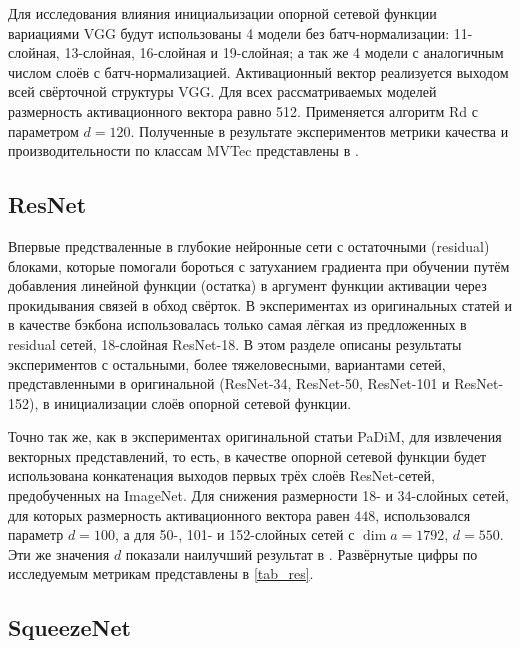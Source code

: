 \documentclass{article}
\begin{document}
\begin{large}
Для исследования влияния инициальизации опорной сетевой функции вариациями VGG будут использованы 4 модели без батч-нормализации: 11-слойная, 13-слойная, 16-слойная и 19-слойная; а так же 4 модели с аналогичным числом слоёв с батч-нормализацией. Активационный вектор реализуется выходом всей свёрточной структуры VGG. Для всех рассматриваемых моделей размерность активационного вектора равно 512. Применяется алгоритм Rd с параметром $d = 120$. Полученные в результате экспериментов метрики качества и производительности по классам MVTec представлены в .

\subsection{ResNet}

Впервые предстваленные в \cite{resnet} глубокие нейронные сети с остаточными (residual) блоками, которые помогали бороться с затуханием градиента при обучении путём добавления линейной функции (остатка) в аргумент функции активации через прокидывания связей в обход свёрток. В экспериментах из оригинальных статей \cite{spade} и \cite{padim} в качестве бэкбона использовалась только самая лёгкая из предложенных в \cite{resnet} residual сетей, 18-слойная ResNet-18. В этом разделе описаны результаты экспериментов с остальными, более тяжеловесными, вариантами сетей, представленными в оригинальной \cite{resnet} (ResNet-34, ResNet-50, ResNet-101 и ResNet-152), в инициализации слоёв опорной сетевой функции.

Точно так же, как в экспериментах оригинальной статьи PaDiM, для извлечения векторных представлений, то есть, в качестве опорной сетевой функции будет использована конкатенация выходов первых трёх слоёв ResNet-сетей, предобученных на ImageNet. Для снижения размерности 18- и 34-слойных сетей, для которых размерность активационного вектора равен $448$, использовался параметр $d = 100$, а для 50-, 101- и 152-слойных сетей с $\dim a = 1792$, $d = 550$. Эти же значения $d$ показали наилучший результат в \cite{padim}. Развёрнутые цифры по исследуемым метрикам представлены в \ref{tab_res}.

\subsection{SqueezeNet}


\end{large}
\end{document}
